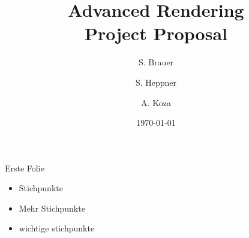 \documentclass{beamer}
\title[Project Proposal]{Advanced Rendering \\ Project Proposal}
\author[Brauer, Heppner, Koza]
{S. Brauer \and S. Heppner \and A. Koza}
\institute[University of Paderborn]{Institute for Computer Science}
\date{\today}
\begin{document}
\begin{frame}
  \titlepage
\end{frame}

\begin{frame}{Erste Folie}
	\begin{itemize}
		\item Stichpunkte
		\item Mehr Stichpunkte
		\item \alert{wichtige stichpunkte}
	\end{itemize}
\end{frame}
\end{document}
